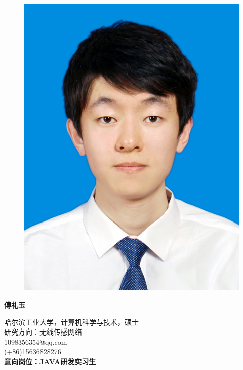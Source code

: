 \documentclass{resume} %
\begin{document}
\begin{figure}
\vspace{-12pt}
\includegraphics[scale=0.8]{fuliyu.jpg}
\end{figure}

\fontsize{20pt}{0pt}\selectfont
\bf{傅礼玉}

\normalfont
\fontsize{12pt}{14pt}\selectfont
哈尔滨工业大学，计算机科学与技术，硕士\\
研究方向：无线传感网络\\
1098356354@qq.com\\
(+86)15636828276\\
{\bf\Large\rmfamily    意向岗位：JAVA研发实习生}
\vspace{8pt}


\end{document}

